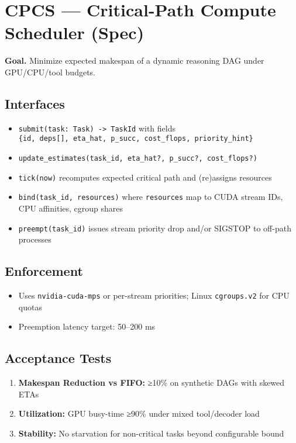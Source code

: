 \documentclass[
]{article}
\author{}
\date{}
\providecommand{\tightlist}{%
  \setlength{\itemsep}{0pt}\setlength{\parskip}{0pt}}
\begin{document}
\hypertarget{cpcs-critical-path-compute-scheduler-spec}{%
\section{CPCS --- Critical-Path Compute Scheduler
(Spec)}\label{cpcs-critical-path-compute-scheduler-spec}}

\textbf{Goal.} Minimize expected makespan of a dynamic reasoning DAG
under GPU/CPU/tool budgets.

\hypertarget{interfaces}{%
\subsection{Interfaces}\label{interfaces}}

\begin{itemize}
\tightlist
\item
  \texttt{submit(task:\ Task)\ -\textgreater{}\ TaskId} with fields
  \texttt{\{id,\ deps{[}{]},\ eta\_hat,\ p\_succ,\ cost\_flops,\ priority\_hint\}}
\item
  \texttt{update\_estimates(task\_id,\ eta\_hat?,\ p\_succ?,\ cost\_flops?)}
\item
  \texttt{tick(now)} recomputes expected critical path and (re)assigns
  resources
\item
  \texttt{bind(task\_id,\ resources)} where \texttt{resources} map to
  CUDA stream IDs, CPU affinities, cgroup shares
\item
  \texttt{preempt(task\_id)} issues stream priority drop and/or SIGSTOP
  to off-path processes
\end{itemize}

\hypertarget{enforcement}{%
\subsection{Enforcement}\label{enforcement}}

\begin{itemize}
\tightlist
\item
  Uses \texttt{nvidia-cuda-mps} or per-stream priorities; Linux
  \texttt{cgroups.v2} for CPU quotas
\item
  Preemption latency target: 50--200 ms
\end{itemize}

\hypertarget{acceptance-tests}{%
\subsection{Acceptance Tests}\label{acceptance-tests}}

\begin{enumerate}
\def\labelenumi{\arabic{enumi}.}
\tightlist
\item
  \textbf{Makespan Reduction vs FIFO:} ≥10\% on synthetic DAGs with
  skewed ETAs
\item
  \textbf{Utilization:} GPU busy-time ≥90\% under mixed tool/decoder
  load
\item
  \textbf{Stability:} No starvation for non-critical tasks beyond
  configurable bound
\end{enumerate}
\end{document}
